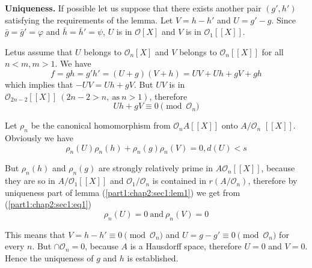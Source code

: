 \medskip
\noindent \textbf{Uniqueness.} If possible let us suppose that there exists
another pair $(g',  h')$ satisfying the requirements of the lemma. Let
$V=h-h'$ and $U = g'-g$. Since $\bar{g}= \bar{g}'= \varphi$ and
$\bar{h}= \bar{h}'= \psi$, $U$ is in $\mathscr{O}[X]$ and $V$ is in
$\mathscr{O}_1[[X]]$. 

Let\pageoriginale us assume that $U$ belongs to $\mathscr{O}_n[X]$ and
$V$ belongs to $\mathscr{O}_n[[X]]$ for all $n< m, m>1$. We have  
$$ 
f=gh=g' h'= (U +g) (V +h)= UV +Uh+gV+gh
$$
which implies that $-UV = Uh + gV$. But $UV$ is in
$\mathscr{O}_{2n-2}[[X]]~ (2n -2> n, ~\text{as}~ n> 1)$, therefore 
$$
U h + gV \equiv 0 \pmod{\mathscr{O}_n} 
$$

Let $\rho_n$ be the canonical homomorphism from $\mathscr{O}_n A[[X]]$
onto $A/ \mathscr{O}_n$ $[[X]]$. Obviously we have 
\begin{equation*}
  \rho_n (U) \rho_n(h) + \rho_n (g) \rho_n (V)= 0, d(U)<
  s\tag{1}\label{part1:chap2:sec1:eq1} 
\end{equation*}

But $\rho_n (h)$ and $\rho_n (g)$ are strongly relatively prime in $A
\mathscr{O}_n [[X]]$, because they are so in $A/ \mathscr{O}_1[[X]]$
and $\mathscr{O}_1 / \mathscr{O}_n$ is contained in $r (A/
\mathscr{O}_n)$, therefore by uniqueness part of lemma
(\ref{part1:chap2:sec1:lem1}) we get from (\ref{part1:chap2:sec1:eq1}) 
$$
\rho_n(U) =0 ~\text{and}~ \rho_n (V) =0
$$

This means that $V = h-h' \equiv 0 \pmod {\mathscr{O}_n}$ and $U = g -
g' \equiv 0 \pmod {\mathscr{O}_n}$ for every $n$. But $\cap
\mathscr{O}_n =0$, because $A$ is a Hausdorff space, therefore $U=0$
and $V=0$. Hence the uniqueness of $g$ and $h$ is established. 

